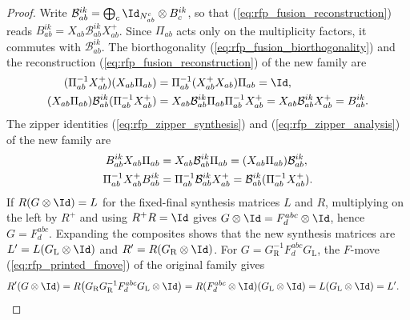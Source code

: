 \begin{proof}\leanok
    Write $\mathcal B^{ik}_{ab}=\bigoplus_c\Id_{N_{ab}^c}\otimes B_c^{ik}$,
    so that (\ref{eq:rfp_fusion_reconstruction}) reads
    $B_{ab}^{ik}=X_{ab}\mathcal B^{ik}_{ab}X^+_{ab}$. Since $\Pi_{ab}$ acts
    only on the multiplicity factors, it commutes with
    $\mathcal B^{ik}_{ab}$. The biorthogonality
    (\ref{eq:rfp_fusion_biorthogonality}) and the reconstruction
    (\ref{eq:rfp_fusion_reconstruction}) of the new family are
    \begin{align}
        (\Pi_{ab}^{-1}X^+_{ab})(X_{ab}\Pi_{ab})
         & =\Pi_{ab}^{-1}(X^+_{ab}X_{ab})\Pi_{ab}=\Id,
        \notag                                                      \\
        (X_{ab}\Pi_{ab})\mathcal B^{ik}_{ab}(\Pi_{ab}^{-1}X^+_{ab})
         & =X_{ab}\mathcal B^{ik}_{ab}\Pi_{ab}\Pi_{ab}^{-1}X^+_{ab}
        =X_{ab}\mathcal B^{ik}_{ab}X^+_{ab}=B_{ab}^{ik}.
        \notag
    \end{align}
    The zipper identities (\ref{eq:rfp_zipper_synthesis}) and
    (\ref{eq:rfp_zipper_analysis}) of the new family are
    \begin{align}
        B_{ab}^{ik}X_{ab}\Pi_{ab}
         & =X_{ab}\mathcal B^{ik}_{ab}\Pi_{ab}
        =(X_{ab}\Pi_{ab})\mathcal B^{ik}_{ab},
        \notag                                        \\
        \Pi_{ab}^{-1}X^+_{ab}B_{ab}^{ik}
         & =\Pi_{ab}^{-1}\mathcal B^{ik}_{ab}X^+_{ab}
        =\mathcal B^{ik}_{ab}(\Pi_{ab}^{-1}X^+_{ab}).
        \notag
    \end{align}
    If $R(G\otimes\Id)=L$ for the fixed-final synthesis matrices $L$ and $R$,
    multiplying on the left by $R^+$ and using $R^+R=\Id$ gives
    $G\otimes\Id=F^{abc}_d\otimes\Id$, hence $G=F^{abc}_d$.
    Expanding the composites shows that the new synthesis matrices are
    $L'=L(G_{\mathrm L}\otimes\Id)$ and $R'=R(G_{\mathrm R}\otimes\Id)$.
    For $G=G_{\mathrm R}^{-1}F^{abc}_dG_{\mathrm L}$, the $F$-move
    (\ref{eq:rfp_printed_fmove}) of the original family gives
    \begin{align}
        R'(G\otimes\Id)
         & =R\bigl(G_{\mathrm R}G_{\mathrm R}^{-1}F^{abc}_dG_{\mathrm L}
        \otimes\Id\bigr)
        =R(F^{abc}_d\otimes\Id)(G_{\mathrm L}\otimes\Id)
        =L(G_{\mathrm L}\otimes\Id)=L'.
        \notag
    \end{align}

\end{proof}
